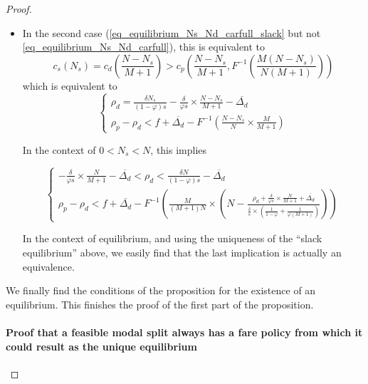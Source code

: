 \documentclass[english, a4paper]{article}
\theoremstyle{plain}
\theoremstyle{definition}
\theoremstyle{remark}
\begin{document}
\begin{proof}
\begin{itemize}
        \item In the second case (\ref{eq_equilibrium_Ns_Nd_carfull_slack} but not \ref{eq_equilibrium_Ns_Nd_carfull}), this is equivalent to 
        \begin{equation}
            c_s(N_s) =  c_d \left( \frac{N-N_s}{M+1} \right) > c_p \left( \frac{N-N_s}{M+1}, F^{-1} \left( \frac{M(N-N_s)}{N(M+1)} \right) \right)
        \end{equation}which is equivalent to
        \begin{equation}
            \left\{
            \begin{array}{l}
                \rho _d = \frac{\delta N_s}{(1- \varphi ) s} - \frac{\delta}{\varphi s}\times \frac{N-N_s}{M+1} - \overline{\Delta _d}\\
                \rho _p - \rho _d < f + \overline{\Delta _d} - F^{-1} \left( \frac{N-N_s}{N}\times \frac{M}{M+1} \right)
            \end{array}
            \right.
        \end{equation}

        In the context of $0 < N_s < N$, this implies

        \begin{equation}
            \left\{
            \begin{array}{l}
                -\frac{\delta}{\varphi s}\times \frac{N}{M+1} - \overline{\Delta _d} < \rho _d < \frac{\delta N}{(1-\varphi ) s} - \overline{\Delta _d}\\
                \rho _p - \rho _d < f + \overline{\Delta _d} - F^{-1}\left( \frac{M}{(M+1)N} \times \left( N - \frac{\rho_d + \frac{\delta}{\varphi s}\times \frac{N}{M+1} + \overline{\Delta _d}}{\frac{\delta}{s}\times \left( \frac{1}{1-\varphi} + \frac{1}{\varphi (M+1)} \right)} \right)\right)
            \end{array}
            \right.
        \end{equation}

        In the context of equilibrium, and using the uniqueness of the ``slack equilibrium'' above, we easily find that the last implication is actually an equivalence.
    \end{itemize}
    
    We finally find the conditions of the proposition for the existence of an equilibrium. This finishes the proof of the first part of the proposition.


    \item \paragraph{Proof that a feasible modal split always has a fare policy from which it could result as the unique equilibrium}
    

\end{proof}
\end{document}
